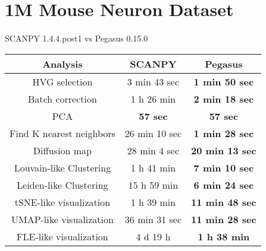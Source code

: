 \documentclass[10pt]{article}
\begin{document}
\section{1M Mouse Neuron Dataset}

\paragraph{}
SCANPY 1.4.4.post1 \qquad vs \qquad Pegasus 0.15.0

\begin{table}[H]
	\centering
	\begin{tabular}{|c|c|c|}
		\hline
		Analysis  & SCANPY & Pegasus\\
		\hline \hline
		HVG selection  & 3 min 43 sec  & \textbf{1 min 50 sec}  \\
		\hline
		Batch correction  & 1 h 26 min  & \textbf{2 min 18 sec}  \\
		\hline
		PCA   & \textbf{57 sec}  & \textbf{57 sec}  \\
		\hline
		Find K nearest neighbors & 26 min 10 sec  & \textbf{1 min 28 sec}  \\
		\hline
		Diffusion map  & 28 min 4 sec  & \textbf{20 min 13 sec}  \\
		\hline
		Louvain-like Clustering  & 1 h 41 min  & \textbf{7 min 10 sec}  \\
		\hline
		Leiden-like Clustering & 15 h 59 min  & \textbf{6 min 24 sec}  \\
		\hline
		tSNE-like visualization & 1 h 39 min  & \textbf{11 min 48 sec}  \\
		\hline
		UMAP-like visualization & 36 min 31 sec   & \textbf{11 min 28 sec}  \\
		\hline
		FLE-like visualization  & 4 d 19 h  & \textbf{1 h 38 min}  \\
		\hline
	\end{tabular}
\end{table}
\end{document}
